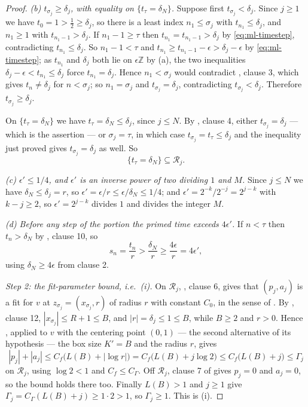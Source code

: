 \begin{proof}
\emph{(b) $t_{\sigma_j}\ge\delta_j$, with equality on $\{t_\tau=\delta_N\}$.}
Suppose first $t_{\sigma_j}<\delta_j$. Since $j\ge1$ we have
$t_0=1>\tfrac12\ge\delta_j$, so there is a least index $n_1\le\sigma_j$ with
$t_{n_1}\le\delta_j$, and $n_1\ge1$ with $t_{n_1-1}>\delta_j$. If
$n_1-1\ge\tau$ then $t_{n_1}=t_{n_1-1}>\delta_j$ by \eqref{eq:ml-timestep},
contradicting $t_{n_1}\le\delta_j$. So $n_1-1<\tau$ and
$t_{n_1}\ge t_{n_1-1}-\epsilon>\delta_j-\epsilon$ by
\eqref{eq:ml-timestep}; as $t_{n_1}$ and $\delta_j$ both lie on
$\epsilon\mathbb Z$ by (a), the two inequalities
$\delta_j-\epsilon<t_{n_1}\le\delta_j$ force $t_{n_1}=\delta_j$. Hence
$n_1<\sigma_j$ would contradict , clause 3, which gives
$t_n\ne\delta_j$ for $n<\sigma_j$; so $n_1=\sigma_j$ and
$t_{\sigma_j}=\delta_j$, contradicting $t_{\sigma_j}<\delta_j$. Therefore
$t_{\sigma_j}\ge\delta_j$.

On $\{t_\tau=\delta_N\}$ we have $t_\tau=\delta_N\le\delta_j$, since
$j\le N$. By , clause 4, either
$t_{\sigma_j}=\delta_j$ --- which is the assertion --- or
$\sigma_j=\tau$, in which case $t_{\sigma_j}=t_\tau\le\delta_j$ and the
inequality just proved gives $t_{\sigma_j}=\delta_j$ as well. So
\begin{equation}\label{eq:ml-Rj}
  \{t_\tau=\delta_N\}\subseteq\mathcal R_j .
\end{equation}

\emph{(c) $\epsilon'\le1/4$, and $\epsilon'$ is an inverse power of two
dividing $1$ and $M$.} Since $j\le N$ we have $\delta_N\le\delta_j=r$, so
$\epsilon'=\epsilon/r\le\epsilon/\delta_N\le1/4$; and
$\epsilon'=2^{-k}/2^{-j}=2^{j-k}$ with $k-j\ge2$, so $\epsilon'=2^{j-k}$
divides $1$ and divides the integer $M$.

\emph{(d) Before any step of the portion the primed time exceeds
$4\epsilon'$.} If $n<\tau$ then $t_n>\delta_N$ by ,
clause 10, so
\begin{equation}\label{eq:ml-primed-time}
  s_n=\frac{t_n}{r}>\frac{\delta_N}{r}\ge\frac{4\epsilon}{r}=4\epsilon',
\end{equation}
using $\delta_N\ge4\epsilon$ from clause 2.

\emph{Step 2: the fit-parameter bound, i.e.\ (i).}
On $\mathcal R_j$, , clause 6, gives that $(p_j,a_j)$ is a
fit for $v$ at $z_{\sigma_j}=(x_{\sigma_j},r)$ of radius $r$ with constant
$C_0$, in the sense of . By , clause 12,
$|x_{\sigma_j}|\le R+1\le B$, and $|r|=\delta_j\le1\le B$, while $B\ge2$ and
$r>0$. Hence , applied to $v$ with the centering point
$(0,1)$ --- the second alternative of its hypothesis --- the box size $K'=B$
and the radius $r$, gives
\[
  |p_j|+|a_j|\le C_f\bigl(L(B)+|\log r|\bigr)
   =C_f\bigl(L(B)+j\log2\bigr)\le C_f\bigl(L(B)+j\bigr)\le\Gamma_j
\]
on $\mathcal R_j$, using $\log2<1$ and $C_f\le C_\Gamma$. Off $\mathcal R_j$,
clause 7 of  gives $p_j=0$ and $a_j=0$, so the bound holds
there too. Finally $L(B)>1$ and $j\ge1$ give
$\Gamma_j=C_\Gamma(L(B)+j)\ge1\cdot2>1$, so $\Gamma_j\ge1$. This is (i).


\end{proof}
